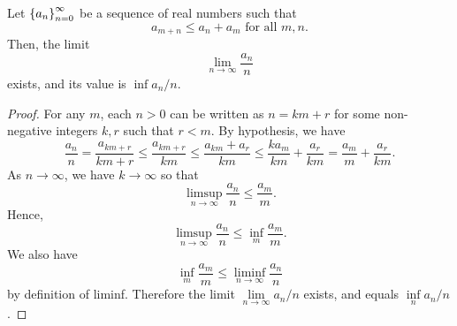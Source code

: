 \documentclass[10pt,twoside,draft]{book}
\begin{document}
\begin{lemma}
  \citep{walters}
  Let $\left \{ a_n \right \}^{\infty}_{n = 0}$ be a sequence of real numbers such that 
  \begin{equation*}
    a_{m+n} \leq a_n + a_m \mbox{ for all } m,n.
  \end{equation*}
  Then, the limit
  \begin{equation*}
    \lim\limits_{n \to \infty} \frac{a_n}{n} 
  \end{equation*}
  exists, and its value is $\inf a_n / n$.
  \begin{proof}
    For any $m$, each $n > 0$ can be written as $n = km + r$ for some non-negative integers $k,r$ such that $r < m$.
    By hypothesis, we have 
    \begin{equation*}
      \frac{a_n}{n}
      = \frac{a_{km + r}}{km + r}
      \leq \frac{a_{km + r}}{km}
      \leq \frac{a_{km} + a_r}{km}
      \leq \frac{k a_{m}}{km} + \frac{a_r}{km}
      = \frac{a_{m}}{m} + \frac{a_r}{km}.
    \end{equation*}
    As $n \to \infty$, we have $k \to \infty$ so that
    \begin{equation*}
      \limsup\limits_{n \to \infty} \frac{a_n}{n} \leq \frac{a_m}{m}.
    \end{equation*}
    Hence,
    \begin{equation*}
      \limsup\limits_{n \to \infty} \frac{a_n}{n} \leq \inf\limits_m \frac{a_m}{m}.
    \end{equation*}
    We also have
    \begin{equation*}
      \inf\limits_{m} \frac{a_m}{m} \leq \liminf\limits_{n \to \infty} \frac{a_n}{n}
    \end{equation*}
    by definition of liminf.
    Therefore the limit $\lim\limits_{n \to \infty} a_n/n$ exists, and equals $\inf\limits_{n} a_n/n$.
  \end{proof}
\end{lemma}
\end{document}
